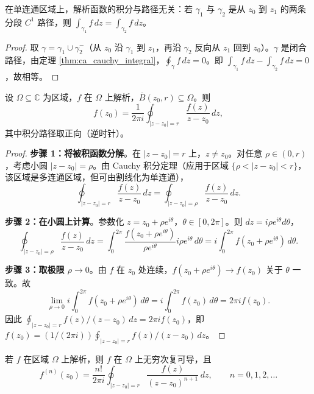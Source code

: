 \begin{corollary}\label{cor:ca_cauchy_integral_equivalent}
在单连通区域上，解析函数的积分与路径无关：若 $\gamma_1$ 与 $\gamma_2$ 是从 $z_0$ 到 $z_1$ 的两条分段 $C^1$ 路径，则 $\int_{\gamma_1} f \, dz = \int_{\gamma_2} f \, dz$。
\end{corollary}

\begin{proof}
取 $\gamma = \gamma_1 \cup \gamma_2^-$（从 $z_0$ 沿 $\gamma_1$ 到 $z_1$，再沿 $\gamma_2$ 反向从 $z_1$ 回到 $z_0$）。$\gamma$ 是闭合路径，由定理 \ref{thm:ca_cauchy_integral}，$\oint_\gamma f \, dz = 0$。即 $\int_{\gamma_1} f \, dz - \int_{\gamma_2} f \, dz = 0$，故相等。
\end{proof}

\begin{theorem}\label{thm:ca_cauchy_formula}
设 $\Omega \subseteq \mathbb{C}$ 为区域，$f$ 在 $\Omega$ 上解析，$\overline{B}(z_0, r) \subseteq \Omega$。则
\[
f(z_0) = \frac{1}{2\pi i} \oint_{|z - z_0| = r} \frac{f(z)}{z - z_0} \, dz,
\]
其中积分路径取正向（逆时针）。
\end{theorem}

\begin{proof}
\textbf{步骤 1：将被积函数分解}。在 $|z - z_0| = r$ 上，$z \neq z_0$。对任意 $\rho \in (0, r)$，考虑小圆 $|z - z_0| = \rho$。由 Cauchy 积分定理（应用于区域 $\{\rho < |z - z_0| < r\}$，该区域是多连通区域，但可由割线化为单连通），
\[
\oint_{|z - z_0| = r} \frac{f(z)}{z - z_0} \, dz = \oint_{|z - z_0| = \rho} \frac{f(z)}{z - z_0} \, dz.
\]

\textbf{步骤 2：在小圆上计算}。参数化 $z = z_0 + \rho e^{i\theta}$，$\theta \in [0, 2\pi]$。则 $dz = i\rho e^{i\theta} d\theta$，
\[
\oint_{|z - z_0| = \rho} \frac{f(z)}{z - z_0} \, dz = \int_0^{2\pi} \frac{f(z_0 + \rho e^{i\theta})}{\rho e^{i\theta}} i\rho e^{i\theta} \, d\theta = i \int_0^{2\pi} f(z_0 + \rho e^{i\theta}) \, d\theta.
\]

\textbf{步骤 3：取极限 $\rho \to 0$}。由 $f$ 在 $z_0$ 处连续，$f(z_0 + \rho e^{i\theta}) \to f(z_0)$ 关于 $\theta$ 一致。故
\[
\lim_{\rho \to 0} i \int_0^{2\pi} f(z_0 + \rho e^{i\theta}) \, d\theta = i \int_0^{2\pi} f(z_0) \, d\theta = 2\pi i f(z_0).
\]
因此 $\oint_{|z - z_0| = r} f(z)/(z - z_0) \, dz = 2\pi i f(z_0)$，即 $f(z_0) = (1/(2\pi i)) \oint_{|z - z_0| = r} f(z)/(z - z_0) \, dz$。
\end{proof}

\begin{corollary}[解析函数的无穷可微性]\label{cor:ca_infinite_differentiable}
若 $f$ 在区域 $\Omega$ 上解析，则 $f$ 在 $\Omega$ 上无穷次复可导，且
\[
f^{(n)}(z_0) = \frac{n!}{2\pi i} \oint_{|z - z_0| = r} \frac{f(z)}{(z - z_0)^{n+1}} \, dz, \qquad n = 0, 1, 2, \dots
\]
\end{corollary}

